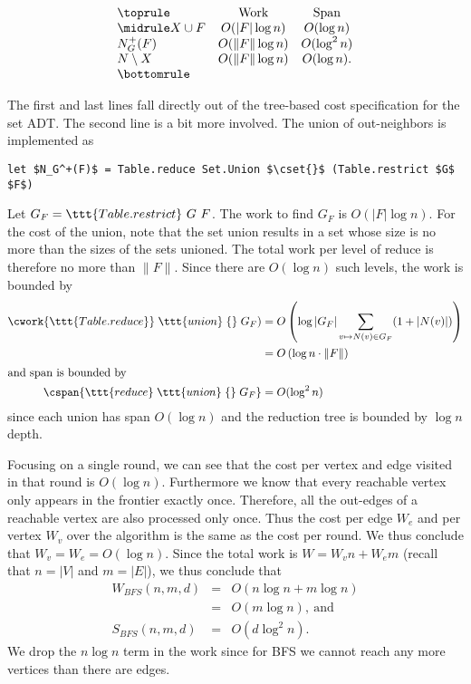 \[
\begin{array}{lcc}
\toprule
  & \mbox{Work} & \mbox{Span} \\ 
\midrule

X \cup F & O(|F| \log n) & O(\log n) \\
N_G^+(F) & O(\|F\| \log n) & O(\log^2 n) \\
N \setminus X & O(\|F\| \log n) & O(\log n). \\
\bottomrule
\end{array}
\]

The first and last lines fall directly out of the tree-based cost
specification for the set ADT. 
%
 The second line is a bit more involved.  The union of out-neighbors
 is implemented as
\begin{lstlisting}[numbers=none]
let $N_G^+(F)$ = Table.reduce Set.Union $\cset{}$ (Table.restrict $G$ $F$)
\end{lstlisting}
Let $G_F = \ttt{Table.restrict}~G~F$. The work to find $G_F$ is $O(|F|
\log n)$.  
%
For the cost of the union, note that the set union results in a set
whose size is no more than the sizes of the sets unioned.  The total
work per level of reduce is therefore no more than $\|F\|$.  Since
there are $O(\log{n})$ such levels, the work is bounded by
%
\begin{align*}
\cwork{\ttt{Table.reduce}}\; \ttt{union}\; \{\}\; G_F)
& =  O\left(\log |G_F| \sum_{v \mapsto N(v) \in G_F} (1 + |N(v)|)\right)
\\
& = O\left(\log n \cdot \|F\|\right)
\\
\intertext{and span is bounded by}
%
\cspan{\ttt{reduce}\; \ttt{union}\; \{\}\;  G_F} & =  O(\log^2 n)
\end{align*} 
%
since each union has span $O(\log n)$ and the reduction
tree is bounded by $\log n$ depth.

%
%

Focusing on a single round, we can see that the cost per vertex and
edge visited in that round is $O(\log n)$.  Furthermore we know that
every reachable vertex only appears in the frontier exactly once.
Therefore, all the out-edges of a reachable vertex are also processed
only once.  Thus the cost per edge $W_e$ and per vertex $W_v$
over the algorithm is the same as the cost per round.  We thus
conclude that $W_v = W_e = O(\log{n})$.
%
Since the total work is $W = W_v n + W_e m$ (recall that $n = |V|$ and
$m = |E|$), we thus conclude that
\begin{eqnarray*}
W_{BFS}(n,m,d) & = & O(n \log n + m \log n)\\
               & = & O(m \log n),~\mbox{and}
\\
S_{BFS}(n,m,d) & = & O(d \log^2 n).
\end{eqnarray*}
We drop the $n \log n$ term in the work since for BFS we cannot reach
any more vertices than there are edges.

